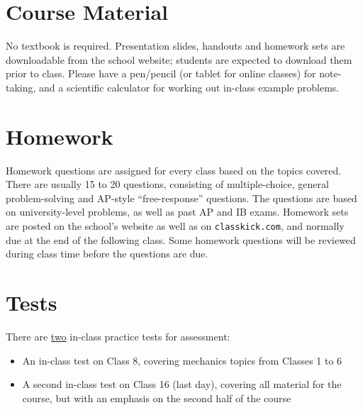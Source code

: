 \documentclass{../../../oss-handout}
\begin{document}
\section{Course Material}
No textbook is required. Presentation slides, handouts and homework sets are
downloadable from the school website; students are expected to download them
prior to class. Please have a pen/pencil (or tablet for online classes) for
note-taking, and a scientific calculator for working out in-class example
problems.






\section{Homework}
Homework questions are assigned for every class based on the topics covered.
There are usually 15 to 20 questions, consisting of multiple-choice, general
problem-solving and AP-style ``free-response'' questions. The questions are
based on university-level problems, as well as past AP and IB exams. Homework
sets are posted on the school's website as well as on \texttt{classkick.com},
and normally due at the end of the following class. Some homework questions
will be reviewed during class time before the questions are due.


\section{Tests}
There are \underline{two} in-class practice tests for assessment:
\begin{itemize}[nosep,leftmargin=15pt]
\item An in-class test on Class 8, covering mechanics topics from Classes 1 to 6
\item A second in-class test on Class 16 (last day), covering all material for
  the course, but with an emphasis on the second half of the course
\end{itemize}
\end{document}
